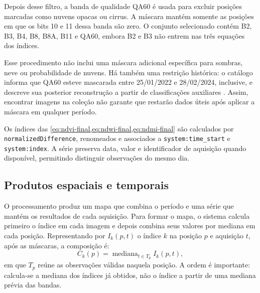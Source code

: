 Depois desse filtro, a banda de qualidade QA60 é usada para excluir posições marcadas como nuvens opacas ou cirrus. A máscara mantém somente as posições em que os bits 10 e 11 dessa banda são zero. O conjunto selecionado contém B2, B3, B4, B8, B8A, B11 e QA60, embora B2 e B3 não entrem nas três equações dos índices.

Esse procedimento não inclui uma máscara adicional específica para sombras, neve ou probabilidade de nuvens. Há também uma restrição histórica: o catálogo informa que QA60 esteve mascarada entre 25/01/2022 e 28/02/2024, inclusive, e descreve sua posterior reconstrução a partir de classificações auxiliares \citep{GOOGLE_S2_SR}. Assim, encontrar imagens na coleção não garante que restarão dados úteis após aplicar a máscara em qualquer período.

Os índices das \cref{eq:ndvi-final,eq:ndwi-final,eq:ndmi-final} são calculados por \texttt{normalizedDifference}, renomeados e associados a \texttt{system:time\_start} e \texttt{system:index}. A série preserva data, valor e identificador de aquisição quando disponível, permitindo distinguir observações do mesmo dia.

\subsection{Produtos espaciais e temporais}\label{sec:agregacoes-final}

O processamento produz um mapa que combina o período e uma série que mantém os resultados de cada aquisição. Para formar o mapa, o sistema calcula primeiro o índice em cada imagem e depois combina seus valores por mediana em cada posição. Representando por $I_k(p,t)$ o índice $k$ na posição $p$ e aquisição $t$, após as máscaras, a composição é:
\begin{equation}\label{eq:composto-final}
 C_k(p)=\operatorname{mediana}_{t\in T_p} I_k(p,t),
\end{equation}
em que $T_p$ reúne as observações válidas naquela posição. A ordem é importante: calcula-se a mediana dos índices já obtidos, não o índice a partir de uma mediana prévia das bandas.

